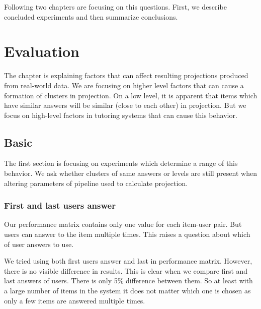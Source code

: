 \documentclass[
  print, %
  table,   %
  nolof,     %
  nolot,     %
  nocover,
  color,
  final,
]{fithesis3}
\begin{document}

Following two chapters are focusing on this questions. First, we describe concluded experiments and then summarize conclusions.


\chapter{Evaluation}\label{evaluation}

The chapter is explaining factors that can affect resulting projections produced from real-world data. We are focusing on higher level factors that can cause a formation of clusters in projection. On a low level, it is apparent that items which have similar answers will be similar (close to each other) in projection. But we focus on high-level factors in tutoring systems that can cause this behavior.


\section{Basic}\label{evaluation-basic}

The first section is focusing on experiments which determine a range of this behavior. We ask whether clusters of same answers or levels are still present when altering parameters of pipeline used to calculate projection.


\subsection{First and last users answer}\label{first-and-last-users-answer}


Our performance matrix contains only one value for each item-user pair. But users can answer to the item multiple times. This raises a question about which of user answers to use.


We tried using both first users answer and last in performance matrix. However, there is no visible difference in results. This is clear when we compare first and last answers of users. There is only 5\% difference between them. So at least with a large number of items in the system it does not matter which one is chosen as only a few items are answered multiple times.
\end{document}
